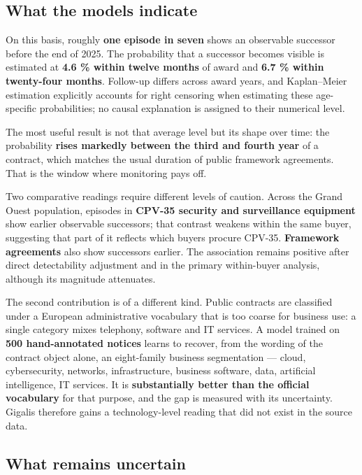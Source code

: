 \subsection*{What the models indicate}

On this basis, roughly \textbf{one episode in seven} shows an observable successor before the end of 2025. The probability that a successor becomes visible is estimated at \textbf{4.6 \% within twelve months} of award and \textbf{6.7 \% within twenty-four months}. Follow-up differs across award years, and Kaplan--Meier estimation explicitly accounts for right censoring when estimating these age-specific probabilities; no causal explanation is assigned to their numerical level.

The most useful result is not that average level but its shape over time: the probability \textbf{rises markedly between the third and fourth year} of a contract, which matches the usual duration of public framework agreements. That is the window where monitoring pays off.

Two comparative readings require different levels of caution. Across the Grand Ouest population, episodes in \textbf{CPV-35 security and surveillance equipment} show earlier observable successors; that contrast weakens within the same buyer, suggesting that part of it reflects which buyers procure CPV-35. \textbf{Framework agreements} also show successors earlier. The association remains positive after direct detectability adjustment and in the primary within-buyer analysis, although its magnitude attenuates.

The second contribution is of a different kind. Public contracts are classified under a European administrative vocabulary that is too coarse for business use: a single category mixes telephony, software and IT services. A model trained on \textbf{500 hand-annotated notices} learns to recover, from the wording of the contract object alone, an eight-family business segmentation --- cloud, cybersecurity, networks, infrastructure, business software, data, artificial intelligence, IT services. It is \textbf{substantially better than the official vocabulary} for that purpose, and the gap is measured with its uncertainty. Gigalis therefore gains a technology-level reading that did not exist in the source data.

\subsection*{What remains uncertain}

